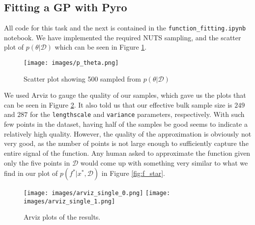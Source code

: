 \subsection{Fitting a GP with Pyro}
All code for this task and the next is contained in the \texttt{function\_fitting.ipynb} notebook. We have implemented the required NUTS sampling, and the scatter plot of $p(\theta | \mathcal{D})$ which can be seen in Figure \ref{fig:p_theta}.
\begin{figure}[h]
\centering
\texttt{[image: images/p\_theta.png]}
\setlength{\belowcaptionskip}{-10pt}
\caption{Scatter plot showing 500 sampled from $p(\theta | \mathcal{D})$}
\label{fig:p_theta}
\end{figure}

We used Arviz to gauge the quality of our samples, which gave us the plots that can be seen in Figure \ref{fig:arviz_old}. It also told us that our effective bulk sample size is $249$ and $287$ for the \texttt{lengthscale} and \texttt{variance} parameters, respectively. With such few points in the dataset, having half of the samples be good seems to indicate a relatively high quality. However, the quality of the approximation is obviously not very good, as the number of points is not large enough to sufficiently capture the entire signal of the function. Any human asked to approximate the function given only the five points in $\mathcal{D}$ would come up with something very similar to what we find in our plot of $p(f^*|x^*,\mathcal{D})$ in Figure \ref{fig:f_star}.

\begin{figure}[h]
\centering
\texttt{[image: images/arviz\_single\_0.png]}
\texttt{[image: images/arviz\_single\_1.png]}
\setlength{\belowcaptionskip}{-10pt}
\caption{Arviz plots of the results.}
\label{fig:arviz_old}
\end{figure}



